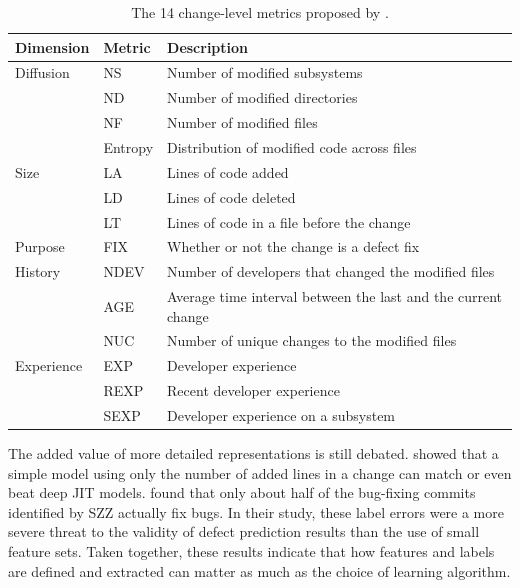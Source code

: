 \documentclass[sigconf,review]{acmart}
\begin{document}
\begin{table}[t]
    \centering
    \footnotesize
    \caption{The 14 change-level metrics proposed by \citet{kamei2013large}.}
    \label{T:kamei-metrics}
    \begin{tabular}{@{}l l p{}@{}}
        \toprule
        \textbf{Dimension} & \textbf{Metric} & \textbf{Description} \\
        \midrule
        Diffusion  & NS      & Number of modified subsystems \\
                   & ND      & Number of modified directories \\
                   & NF      & Number of modified files \\
                   & Entropy & Distribution of modified code across files \\
        \midrule
        Size       & LA      & Lines of code added \\
                   & LD      & Lines of code deleted \\
                   & LT      & Lines of code in a file before the change \\
        \midrule
        Purpose    & FIX     & Whether or not the change is a defect fix \\
        \midrule
        History    & NDEV    & Number of developers that changed the modified files \\
                   & AGE     & Average time interval between the last and the current change \\
                   & NUC     & Number of unique changes to the modified files \\
        \midrule
        Experience & EXP     & Developer experience \\
                   & REXP    & Recent developer experience \\
                   & SEXP    & Developer experience on a subsystem \\
        \bottomrule
    \end{tabular}
\end{table}

The added value of more detailed representations is still debated. \citet{zeng2021deep} showed that a simple model using only the number of added lines in a change can match or even beat deep JIT models. \citet{herbold2022problems} found that only about half of the bug-fixing commits identified by SZZ actually fix bugs. In their study, these label errors were a more severe threat to the validity of defect prediction results than the use of small feature sets. Taken together, these results indicate that how features and labels are defined and extracted can matter as much as the choice of learning algorithm.
\end{document}
